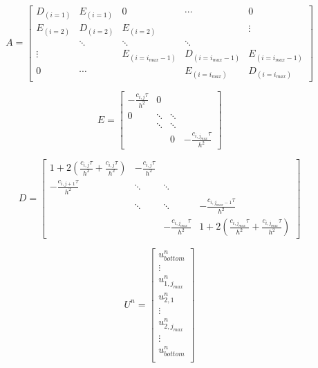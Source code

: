 \documentclass[10pt,a4paper]{report}
\begin{document}
\begin{equation}
A=\begin{bmatrix}
D_{(i=1)} & E_{(i=1)} & 0  & \cdots  & 0  \\
E_{(i=2)} & D_{(i=2)} & E_{(i=2)} &   & \vdots  \\
  & \ddots & \ddots &\ddots & \\
 \vdots &   & E_{(i=i_{max}-1)} & D_{(i=i_{max}-1)} & E_{(i=i_{max}-1)} \\
 0 & \cdots  &   & E_{(i=i_{max})} & D_{(i=i_{max})}    
\end{bmatrix}
\end{equation}
\[
\]

\begin{equation}
E=\begin{bmatrix}
-{\frac{c_{i,j}\tau}{h^2}} & 0 & & \\
0 & \ddots & \ddots & \\
  & \ddots & \ddots & \\
  &        & 0 & -{\frac{c_{i,j_{max}}\tau}{h^2}}  
\end{bmatrix}
\end{equation}
\[
\]

\begin{equation}
D=\begin{bmatrix}
1+2({\frac{c_{i,j}\tau}{h^2}}+{\frac{c_{i,j}\tau}{h^2}}) & -{\frac{c_{i,j}\tau}{h^2}} & &  \\
-{\frac{c_{i,j+1}\tau}{h^2}} & \ddots & \ddots & \\
& \ddots & \ddots & -{\frac{c_{i,j_{max}-1}\tau}{h^2}}\\
 &  & -{\frac{c_{i,j_{max}}\tau}{h^2}} & 1+2({\frac{c_{i,j_{max}}\tau}{h^2}}+{\frac{c_{i,j_{max}}\tau}{h^2}})
\end{bmatrix}
\end{equation}
\[
\]

\begin{equation}
U^{n}=\begin{bmatrix}
u^{n}_{bottom}\\
\vdots\\
u^{n}_{1,j_{max}}\\
u^{n}_{2,1}\\
\vdots\\
u^{n}_{2,j_{max}}\\
\vdots\\
u^{n}_{bottom}\\
\end{bmatrix}
\end{equation}
\[
\]
\end{document}
